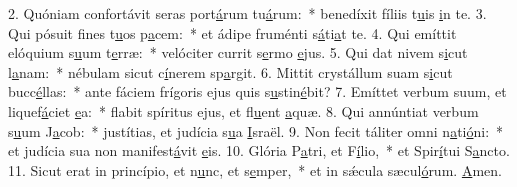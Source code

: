2. Quóniam confortávit seras port\uline{á}rum tu\uline{á}rum:~* benedíxit fíliis t\uline{u}is \uline{i}n te.
3. Qui pósuit fines t\uline{u}os p\uline{a}cem:~* et ádipe fruménti s\uline{á}ti\uline{a}t te.
4. Qui emíttit elóquium s\uline{u}um t\uline{e}rræ:~* velóciter currit s\uline{e}rmo \uline{e}jus.
5. Qui dat nivem s\uline{i}cut l\uline{a}nam:~* nébulam sicut c\uline{í}nerem sp\uline{a}rgit.
6. Mittit crystállum suam s\uline{i}cut bucc\uline{é}llas:~* ante fáciem frígoris ejus quis s\uline{u}stin\uline{é}bit?
7. Emíttet verbum suum, et liquef\uline{á}ciet \uline{e}a:~* flabit spíritus ejus, et fl\uline{u}ent \uline{a}quæ.
8. Qui annúntiat verbum s\uline{u}um J\uline{a}cob:~* justítias, et judícia s\uline{u}a \uline{I}sraël.
9. Non fecit táliter omni n\uline{a}ti\uline{ó}ni:~* et judícia sua non manifest\uline{á}vit \uline{e}is.
10. Glória P\uline{a}tri, et F\uline{í}lio,~* et Spir\uline{í}tui S\uline{a}ncto.
11. Sicut erat in princípio, et n\uline{u}nc, et s\uline{e}mper,~* et in sǽcula sæcul\uline{ó}rum. \uline{A}men.
